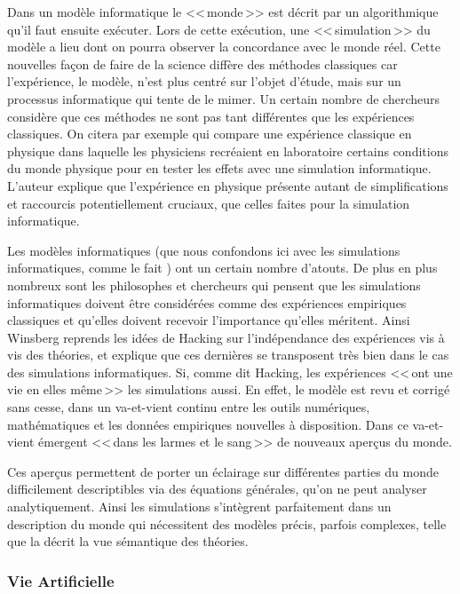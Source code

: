 Dans un modèle informatique le <<\,monde\,>> est décrit par un algorithmique qu'il faut ensuite exécuter. Lors de cette exécution, une <<\,simulation\,>> du modèle a lieu dont on pourra observer la concordance avec le monde réel. Cette nouvelles façon de faire de la science diffère des méthodes classiques car l'expérience, le modèle, n'est plus centré sur l'objet d'étude, mais sur un processus informatique qui tente de le mimer. Un certain nombre de chercheurs considère que ces méthodes ne sont pas tant différentes que les expériences classiques. On citera par exemple \cite{winsberg03simulatedexperimentsmethodologyforavirtualworld} qui compare une expérience classique en physique dans laquelle les physiciens recréaient en laboratoire certains conditions du monde physique pour en tester les effets avec une simulation informatique. L'auteur explique que l'expérience en physique présente autant de simplifications et raccourcis potentiellement cruciaux, que celles faites pour la simulation informatique.

Les modèles informatiques (que nous confondons ici avec les simulations informatiques, comme le fait \cite{winsberg03simulatedexperimentsmethodologyforavirtualworld}) ont un certain nombre d'atouts. De plus en plus nombreux sont les philosophes et chercheurs qui pensent que les simulations informatiques doivent être considérées comme des expériences empiriques classiques et qu'elles doivent recevoir l'importance qu'elles méritent. Ainsi Winsberg reprends les idées de Hacking sur l'indépendance des expériences vis à vis des théories, et explique que ces dernières se transposent très bien dans le cas des simulations informatiques. 
Si, comme dit Hacking, les expériences <<\,ont une vie en elles même\,>>  les simulations aussi. En effet, le modèle est revu et corrigé sans cesse, dans un va-et-vient continu entre les outils numériques, mathématiques et les données empiriques nouvelles à disposition. Dans ce va-et-vient émergent <<\,dans les larmes et le sang\,>> \citet{winsberg09taletwomethods} de nouveaux aperçus du monde.

Ces aperçus permettent de porter un éclairage sur différentes parties du monde difficilement descriptibles via des équations générales, qu'on ne peut analyser analytiquement. Ainsi les simulations s'intègrent parfaitement dans un description du monde qui nécessitent des modèles précis, parfois complexes, telle que la décrit la vue sémantique des théories.

\subsubsection{Vie Artificielle}


